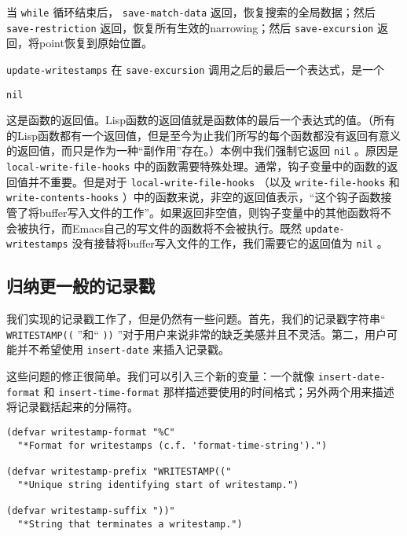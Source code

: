 当 \texttt{while} 循环结束后， \texttt{save-match-data} 返回，恢复搜索的全局数据；然后 \texttt{save-restriction} 返回，恢复所有生效的narrowing；然后 \texttt{save-excursion} 返回，将point恢复到原始位置。

\texttt{update-writestamps} 在 \texttt{save-excursion} 调用之后的最后一个表达式，是一个

\begin{verbatim}
nil
\end{verbatim}

这是函数的返回值。Lisp函数的返回值就是函数体的最后一个表达式的值。（所有的Lisp函数都有一个返回值，但是至今为止我们所写的每个函数都没有返回有意义的返回值，而只是作为一种“副作用”存在。）本例中我们强制它返回 \texttt{nil} 。原因是 \texttt{local-write-file-hooks} 中的函数需要特殊处理。通常，钩子变量中的函数的返回值并不重要。但是对于 \texttt{local-write-file-hooks} （以及 \texttt{write-file-hooks} 和 \texttt{write-contents-hooks} ）中的函数来说，非空的返回值表示，“这个钩子函数接管了将buffer写入文件的工作”。如果返回非空值，则钩子变量中的其他函数将不会被执行，而Emacs自己的写文件的函数将不会被执行。既然 \texttt{update-writestamps} 没有接替将buffer写入文件的工作，我们需要它的返回值为 \texttt{nil} 。

\subsection{归纳更一般的记录戳}
\label{section:04-Generalizing-Writestamps}

我们实现的记录戳工作了，但是仍然有一些问题。首先，我们的记录戳字符串“ \verb|WRITESTAMP((| ”和“ \verb|))| ”对于用户来说非常的缺乏美感并且不灵活。第二，用户可能并不希望使用 \texttt{insert-date} 来插入记录戳。

这些问题的修正很简单。我们可以引入三个新的变量：一个就像 \texttt{insert-date-format} 和 \texttt{insert-time-format} 那样描述要使用的时间格式；另外两个用来描述将记录戳括起来的分隔符。

\begin{verbatim}
(defvar writestamp-format "%C"
  "*Format for writestamps (c.f. 'format-time-string').")

(defvar writestamp-prefix "WRITESTAMP(("
  "*Unique string identifying start of writestamp.")

(defvar writestamp-suffix "))"
  "*String that terminates a writestamp.")
\end{verbatim}

